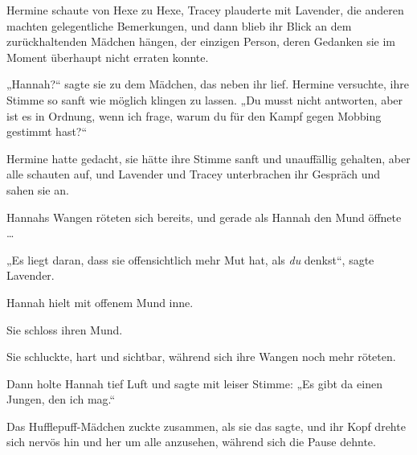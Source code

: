Hermine schaute von Hexe zu Hexe, Tracey plauderte mit Lavender, die anderen machten gelegentliche Bemerkungen, und dann blieb ihr Blick an dem zurückhaltenden Mädchen hängen, der einzigen Person, deren Gedanken sie im Moment überhaupt nicht erraten konnte.

„Hannah?“ sagte sie zu dem Mädchen, das neben ihr lief. Hermine versuchte, ihre Stimme so sanft wie möglich klingen zu lassen.
„Du musst nicht antworten, aber ist es in Ordnung, wenn ich frage, warum du für den Kampf gegen Mobbing gestimmt hast?“

Hermine hatte gedacht, sie hätte ihre Stimme sanft und unauffällig gehalten, aber alle schauten auf, und Lavender und Tracey unterbrachen ihr Gespräch und sahen sie an.

Hannahs Wangen röteten sich bereits, und gerade als Hannah den Mund öffnete …

„Es liegt daran, dass sie offensichtlich mehr Mut hat, als \emph{du} denkst“, sagte Lavender.

Hannah hielt mit offenem Mund inne.

Sie schloss ihren Mund.

Sie schluckte, hart und sichtbar, während sich ihre Wangen noch mehr röteten.

Dann holte Hannah tief Luft und sagte mit leiser Stimme:
„Es gibt da einen Jungen, den ich mag.“

Das Hufflepuff-Mädchen zuckte zusammen, als sie das sagte, und ihr Kopf drehte sich nervös hin und her um alle anzusehen, während sich die Pause dehnte.

